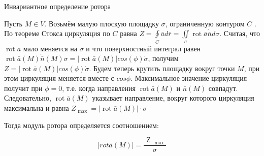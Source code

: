Инвариантное определение ротора

Пусть $M \in V$. Возьмём малую плоскую площадку $\sigma$, ограниченную контуром  $C$ .
 По теореме Стокса циркуляция по $C$ равна $Z = \oint \limits_C \bar a d\bar r = \iint\limits _{\sigma}\operatorname{rot} \bar a\dot \bar n d\sigma$. 
Считая, что $\operatorname{rot} \bar a$ мало меняется на $\sigma$ и что поверхностный интеграл равен $\operatorname{rot} \bar a(M)\dot \bar n(M)\sigma = |\operatorname{rot} \bar a(M)|cos(\phi)\dot \sigma$, 
получим $Z=|\operatorname{rot} \bar a(M)|cos(\phi)\dot\sigma$.
Будем теперь крутить площадку вокруг точки  $M$, при этом циркуляция меняется вместе с $cos\phi$. Максимальное значение циркуляция получит при $\phi=0$, т.е. когда направления $\operatorname{rot} \bar a(M)$ и $\bar n(M)$ совпадут. Следовательно, $\operatorname{rot} \bar a(M)$ указывает направление, вокруг которого циркуляция максимальна и равна $Z_{\mbox { max } } =|\operatorname{rot} \bar a(M)| \cdot \sigma$

Тогда модуль ротора определяется соотношением:

$$| rot\bar { a } (M)| =\frac { \mbox { Z } _ { \mbox { max } } } { \sigma } $$

